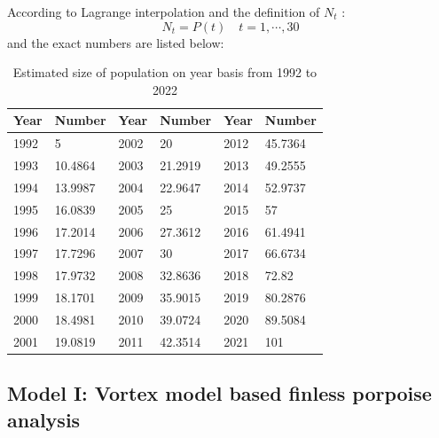 \documentclass{mcmthesis}
\numberwithin{figure}{section}
\numberwithin{table}{section}
\numberwithin{equation}{section}
\begin{document}
\par
According to Lagrange interpolation and the definition of $ N_t $ :
$$
  N_t = P(t) \quad t = 1,\cdots ,30
$$ 
and the exact numbers are listed below:
\begin{table}[htpb!]
  \centering
  \caption{Estimated size of population on year basis from 1992 to 2022} \label{Lagrange table}
  \begin{tabular}{m{2cm}<{\centering}|m{2cm}<{\centering}|m{2cm}<{\centering}|m{2cm}<{\centering}|m{2cm}<{\centering}|m{2cm}<{\centering}}
  \rowcolor{darkOrange}  \textbf{Year}&\textbf{Number}&\textbf{Year}&\textbf{Number}&\textbf{Year}&\textbf{Number}\\ \hline
  \rowcolor{Orange}  1992 & 5       & 2002 & 20      & 2012 & 45.7364 \\
  \rowcolor{lightOrange}  1993 & 10.4864 & 2003 & 21.2919 & 2013 & 49.2555 \\
  \rowcolor{Orange}  1994 & 13.9987 & 2004 & 22.9647 & 2014 & 52.9737 \\
  \rowcolor{lightOrange}  1995 & 16.0839 & 2005 & 25      & 2015 & 57      \\
  \rowcolor{Orange}  1996 & 17.2014 & 2006 & 27.3612 & 2016 & 61.4941 \\
  \rowcolor{lightOrange}  1997 & 17.7296 & 2007 & 30      & 2017 & 66.6734 \\
  \rowcolor{Orange}  1998 & 17.9732 & 2008 & 32.8636 & 2018 & 72.82   \\
  \rowcolor{lightOrange}  1999 & 18.1701 & 2009 & 35.9015 & 2019 & 80.2876 \\
  \rowcolor{Orange}  2000 & 18.4981 & 2010 & 39.0724 & 2020 & 89.5084 \\
  \rowcolor{lightOrange}  2001 & 19.0819 & 2011 & 42.3514 & 2021 & 101     \\
  \end{tabular}
\end{table}

\subsection{Model I: Vortex model based finless porpoise analysis}
\end{document}

